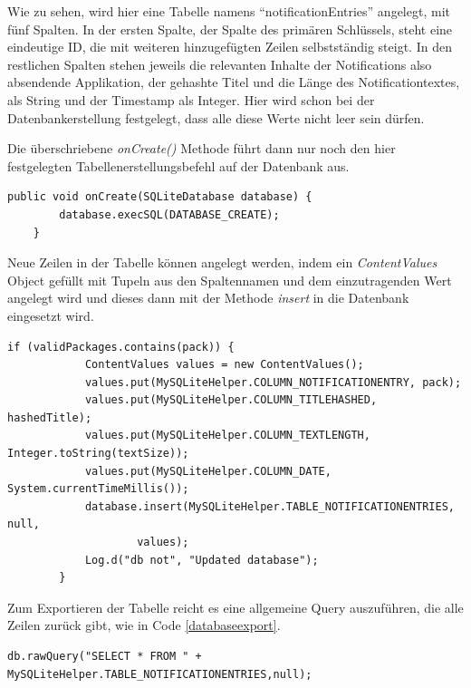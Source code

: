 Wie zu sehen, wird hier eine Tabelle namens "`notificationEntries"' angelegt, mit fünf Spalten.
In der ersten Spalte, der Spalte des primären Schlüssels, steht eine eindeutige ID, die mit weiteren hinzugefügten Zeilen selbstständig steigt.
In den restlichen Spalten stehen jeweils die relevanten Inhalte der Notifications also absendende Applikation, der gehashte Titel und die Länge des Notificationtextes, als String und der Timestamp als Integer. 
Hier wird schon bei der Datenbankerstellung festgelegt, dass alle diese Werte nicht leer sein dürfen.

Die überschriebene \emph{onCreate()} Methode führt dann nur noch den hier festgelegten Tabellenerstellungsbefehl auf der Datenbank aus.

\begin{lstlisting}[frame=single, caption = onCreate Methode, label=databaseoncreate] 
  public void onCreate(SQLiteDatabase database) {
        database.execSQL(DATABASE_CREATE);
    } 
\end{lstlisting}

Neue Zeilen in der Tabelle können angelegt werden, indem ein \emph{ContentValues} Object gefüllt 
mit Tupeln aus den Spaltennamen und dem einzutragenden Wert angelegt wird und dieses dann mit der Methode \emph{insert} in die Datenbank eingesetzt wird.

\begin{lstlisting}[frame=single, caption = Einfügen in die Datenbank, label=databaseinsert] 
if (validPackages.contains(pack)) {
            ContentValues values = new ContentValues();
            values.put(MySQLiteHelper.COLUMN_NOTIFICATIONENTRY, pack);
            values.put(MySQLiteHelper.COLUMN_TITLEHASHED, hashedTitle);
            values.put(MySQLiteHelper.COLUMN_TEXTLENGTH, Integer.toString(textSize));
            values.put(MySQLiteHelper.COLUMN_DATE, System.currentTimeMillis());
            database.insert(MySQLiteHelper.TABLE_NOTIFICATIONENTRIES, null,
                    values);
            Log.d("db not", "Updated database");
        }
\end{lstlisting}

Zum Exportieren der Tabelle reicht es eine allgemeine Query auszuführen, die alle Zeilen zurück gibt, wie in Code \ref{databaseexport}.

\begin{lstlisting}[frame=single, caption = Einfügen in die Datenbank, label=databaseexport] 
  db.rawQuery("SELECT * FROM " + MySQLiteHelper.TABLE_NOTIFICATIONENTRIES,null); 
\end{lstlisting}

